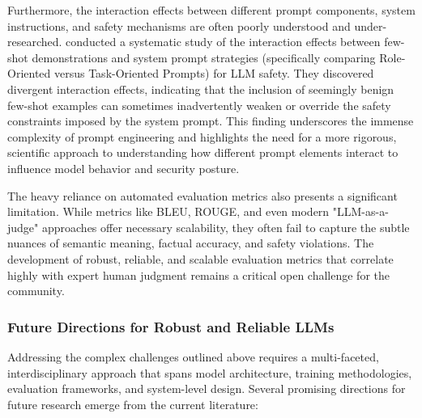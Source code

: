 \documentclass[11pt,a4paper]{article}
\begin{document}
Furthermore, the interaction effects between different prompt components, system instructions, and safety mechanisms are often poorly understood and under-researched. \cite{Wang_2026_LLM} conducted a systematic study of the interaction effects between few-shot demonstrations and system prompt strategies (specifically comparing Role-Oriented versus Task-Oriented Prompts) for LLM safety. They discovered divergent interaction effects, indicating that the inclusion of seemingly benign few-shot examples can sometimes inadvertently weaken or override the safety constraints imposed by the system prompt. This finding underscores the immense complexity of prompt engineering and highlights the need for a more rigorous, scientific approach to understanding how different prompt elements interact to influence model behavior and security posture.

The heavy reliance on automated evaluation metrics also presents a significant limitation. While metrics like BLEU, ROUGE, and even modern "LLM-as-a-judge" approaches offer necessary scalability, they often fail to capture the subtle nuances of semantic meaning, factual accuracy, and safety violations. The development of robust, reliable, and scalable evaluation metrics that correlate highly with expert human judgment remains a critical open challenge for the community.

\subsubsection{Future Directions for Robust and Reliable LLMs}

Addressing the complex challenges outlined above requires a multi-faceted, interdisciplinary approach that spans model architecture, training methodologies, evaluation frameworks, and system-level design. Several promising directions for future research emerge from the current literature:
\end{document}
